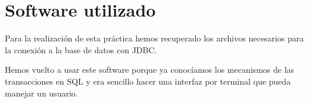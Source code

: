 \section{Software utilizado}
Para la realización de esta práctica hemos recuperado los archivos necesarios para
la conexión a la base de datos con JDBC.

Hemos vuelto a usar este software porque ya conocíamos los mecanismos de las
transacciones en SQL y era sencillo hacer una interfaz por terminal que pueda
manejar un usuario.
